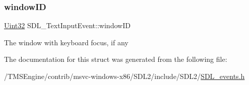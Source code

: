 \subsubsection{\texorpdfstring{window\+ID}{windowID}}
{\footnotesize\ttfamily \hyperlink{_s_d_l__stdinc_8h_add440eff171ea5f55cb00c4a9ab8672d}{Uint32} S\+D\+L\+\_\+\+Text\+Input\+Event\+::window\+ID}

The window with keyboard focus, if any 

The documentation for this struct was generated from the following file\+:\begin{DoxyCompactItemize}
\item 
/\+T\+M\+S\+Engine/contrib/msvc-\/windows-\/x86/\+S\+D\+L2/include/\+S\+D\+L2/\hyperlink{_s_d_l__events_8h}{S\+D\+L\+\_\+events.\+h}\end{DoxyCompactItemize}
